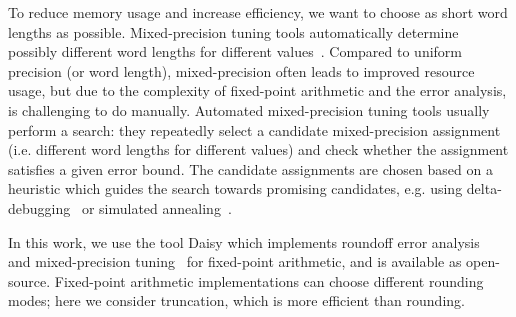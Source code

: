 To reduce memory usage and increase efficiency, we want to choose as short word
lengths as possible. Mixed-precision tuning tools automatically determine possibly different
word lengths for different values~\cite{DaisyTuning,Lee2006}. Compared to uniform precision (or word length),
mixed-precision often leads to improved resource usage, but due to the complexity of
fixed-point arithmetic and the error analysis, is challenging to do manually.  
Automated mixed-precision tuning tools usually perform a search: they repeatedly
select a candidate mixed-precision assignment (i.e. different word lengths for
different values) and check whether the assignment satisfies a given error
bound. The candidate assignments are chosen based on a heuristic which guides
the search towards promising candidates, e.g. using delta-debugging~\cite{DaisyTuning} or
simulated annealing~\cite{Lee2006}.

In this work, we use the tool Daisy which implements roundoff error
analysis~\cite{Daisy} and mixed-precision tuning~\cite{DaisyTuning} for fixed-point arithmetic, and is
available as open-source. Fixed-point arithmetic implementations can choose different
rounding modes; here we consider truncation, which is more efficient than
rounding.